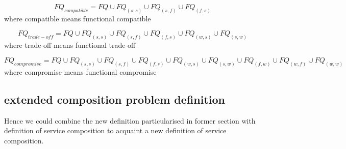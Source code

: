 \documentclass[senior,final,11pt]{iscs-thesis}
\begin{document}
\[FQ_{compatible} = FQ \cup FQ_{(s,s)} \cup FQ_{(s,f)} \cup FQ_{(f,s)}\]where compatible means functional compatible

\[FQ_{trade-off} = FQ \cup FQ_{(s,s)} \cup FQ_{(s,f)} \cup FQ_{(f,s)} \cup FQ_{(w,s)} \cup FQ_{(s,w)}\]where trade-off means functional trade-off

\[FQ_{compromise} = FQ \cup FQ_{(s,s)} \cup FQ_{(s,f)} \cup FQ_{(f,s)} \cup FQ_{(w,s)} \cup FQ_{(s,w)} \cup FQ_{(f,w)} \cup FQ_{(w,f)} \cup FQ_{(w,w)}\]where compromise means functional compromise







\subsection{extended composition problem definition}
Hence we could combine the new definition particularised in former section with definition of service composition to acquaint a new definition of service composition. 
\end{document}
